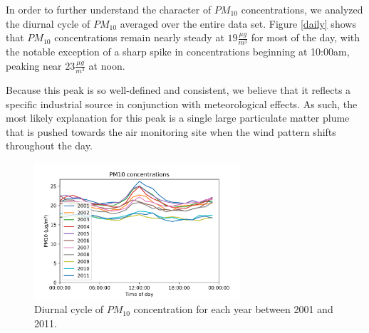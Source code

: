 \documentclass[11pt,journal]{IEEEtran}
\begin{document}
In order to further understand the character of $PM_{10}$ concentrations, we analyzed the diurnal cycle of $PM_{10}$ averaged over the entire data set. Figure \ref{daily} shows that $PM_{10}$ concentrations remain nearly steady at $19 \frac{\mu g}{m^3}$ for most of the day, with the notable exception of a sharp spike in concentrations beginning at 10:00am, peaking near $23 \frac{\mu g}{m^3}$ at noon.

Because this peak is so well-defined and consistent, we believe that it reflects a specific industrial source in conjunction with meteorological effects. As such, the most likely explanation for this peak is a single large particulate matter plume that is pushed towards the air monitoring site when the wind pattern shifts throughout the day. 







\begin{figure}[!htbp]
\centering
\includegraphics[width=3in]{figs/change_pm10}
\caption{Diurnal cycle of $PM_{10}$ concentration for each year between 2001 and 2011.}
\label{change_pm10}
\end{figure}
\end{document}
